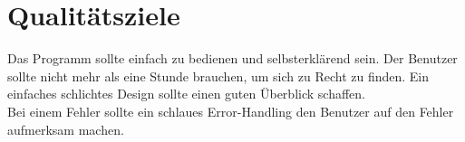 \section{Qualitätsziele}
Das Programm sollte einfach zu bedienen und selbsterklärend sein. Der Benutzer
sollte nicht mehr als eine Stunde brauchen, um sich zu Recht zu finden. Ein
einfaches schlichtes Design sollte einen guten Überblick schaffen.\\
Bei einem Fehler sollte ein schlaues Error-Handling den Benutzer auf den Fehler
aufmerksam machen.
\newpage
